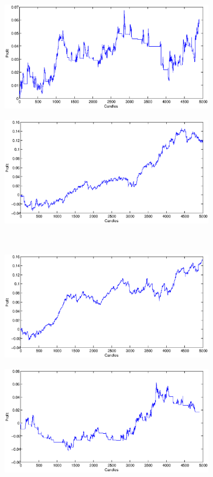 \documentclass{tewiart}
\begin{document}
\begin{figure}[h]
\centering
\begin{minipage}{.49\linewidth}
\centering 
\includegraphics[width=0.82\textwidth]{images/S1a_gbpusd.eps}
\label{jedno}
\end{minipage}
\begin{minipage}{.49\linewidth}
\centering 
\includegraphics[width=0.82\textwidth]{images/S1b_gbpusd.eps}
\label{dwu}
\end{minipage}
\\
\begin{minipage}{.49\linewidth}
\centering 
\includegraphics[width=0.82\textwidth]{images/S1c_gbpusd.eps}
\label{cztero}
\end{minipage}
\begin{minipage}{.49\linewidth}
\centering 
\includegraphics[width=0.82\textwidth]{images/S1d_gbpusd.eps}

\end{minipage}
\end{figure}
\end{document}
